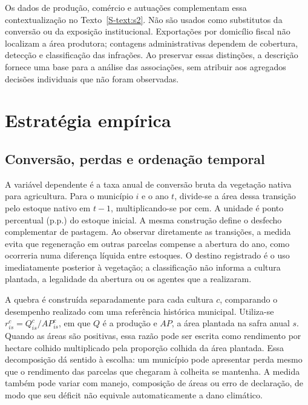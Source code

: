 
\FloatBarrier

Os dados de produção, comércio e autuações complementam essa contextualização no Texto~\ref{S-text:s2}. Não são usados como substitutos da conversão ou da exposição institucional. Exportações por domicílio fiscal não localizam a área produtora; contagens administrativas dependem de cobertura, detecção e classificação das infrações. Ao preservar essas distinções, a descrição fornece uma base para a análise das associações, sem atribuir aos agregados decisões individuais que não foram observadas.

\section{Estratégia empírica}
\label{sec:estrategia}

\subsection{Conversão, perdas e ordenação temporal}

A variável dependente é a taxa anual de conversão bruta da vegetação nativa para agricultura. Para o município $i$ e o ano $t$, divide-se a área dessa transição pelo estoque nativo em $t-1$, multiplicando-se por cem. A unidade é ponto percentual (p.p.) do estoque inicial. A mesma construção define o desfecho complementar de pastagem. Ao observar diretamente as transições, a medida evita que regeneração em outras parcelas compense a abertura do ano, como ocorreria numa diferença líquida entre estoques. O destino registrado é o uso imediatamente posterior à vegetação; a classificação não informa a cultura plantada, a legalidade da abertura ou os agentes que a realizaram.

A quebra é construída separadamente para cada cultura $c$, comparando o desempenho realizado com uma referência histórica municipal. Utiliza-se $r^c_{is}=Q^c_{is}/AP^c_{is}$, em que $Q$ é a produção e $AP$, a área plantada na safra anual $s$. Quando as áreas são positivas, essa razão pode ser escrita como rendimento por hectare colhido multiplicado pela proporção colhida da área plantada. Essa decomposição dá sentido à escolha: um município pode apresentar perda mesmo que o rendimento das parcelas que chegaram à colheita se mantenha. A medida também pode variar com manejo, composição de áreas ou erro de declaração, de modo que seu déficit não equivale automaticamente a dano climático.

